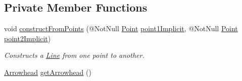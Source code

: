 \subsection*{Private Member Functions}
\begin{DoxyCompactItemize}
\item 
void \hyperlink{classcom_1_1aarrelaakso_1_1drawl_1_1_line_ae037bf2dd2bb2a21ba2d45a752cad9f5}{construct\+From\+Points} (@Not\+Null \hyperlink{classcom_1_1aarrelaakso_1_1drawl_1_1_point}{Point} \hyperlink{classcom_1_1aarrelaakso_1_1drawl_1_1_line_a48220286707ae05387f9c99d9e08784c}{point1\+Implicit}, @Not\+Null \hyperlink{classcom_1_1aarrelaakso_1_1drawl_1_1_point}{Point} \hyperlink{classcom_1_1aarrelaakso_1_1drawl_1_1_line_a055d1e743c66cc808f108664b38d7de2}{point2\+Implicit})
\begin{DoxyCompactList}\small\item\em Constructs a \hyperlink{classcom_1_1aarrelaakso_1_1drawl_1_1_line}{Line} from one point to another. \end{DoxyCompactList}\item 
\hyperlink{classcom_1_1aarrelaakso_1_1drawl_1_1_arrowhead}{Arrowhead} \hyperlink{classcom_1_1aarrelaakso_1_1drawl_1_1_line_a9659e69575b1fd2bd2f6dbfc7e11521b}{get\+Arrowhead} ()
\end{DoxyCompactItemize}
